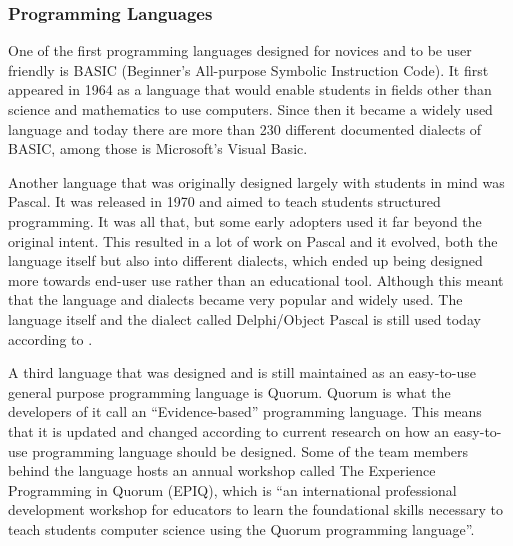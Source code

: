 \subsubsection{Programming Languages}
One of the first programming languages designed for novices and to be user friendly is BASIC (Beginner's All-purpose Symbolic Instruction Code). It first appeared in 1964 as a language that would enable students in fields other than science and mathematics to use computers. Since then it became a widely used language and today there are more than 230 different documented dialects of BASIC, among those is Microsoft's Visual Basic.

Another language that was originally designed largely with students in mind was Pascal. It was released in 1970 and aimed to teach students structured programming. It was all that, but some early adopters used it far beyond the original intent. This resulted in a lot of work on Pascal and it evolved, both the language itself but also into different dialects, which ended up being designed more towards end-user use rather than an educational tool. Although this meant that the language and dialects became very popular and widely used. The language itself and the dialect called Delphi/Object Pascal is still used today according to \cite{tiobe}.

A third language that was designed and is still maintained as an easy-to-use general purpose programming language is Quorum. Quorum is what the developers of it call an ``Evidence-based'' programming language. This means that it is updated and changed according to current research on how an easy-to-use programming language should be designed. Some of the team members behind the language hosts an annual workshop called The Experience Programming in Quorum (EPIQ), which is ``an international professional development workshop for educators to learn the foundational skills necessary to teach students computer science using the Quorum programming language''\cite{quorum_epiq}.
\\
\\

\\
\\
\\
\\
\\

